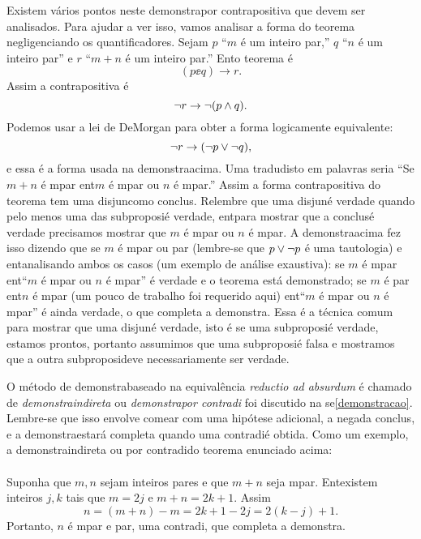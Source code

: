Existem v\'arios pontos neste demonstra\cao por contrapositiva que devem ser analisados. Para ajudar a ver isso, vamos analisar a forma do teorema negligenciando os quantificadores. Sejam $p$ ``$m$ \'e um inteiro par,'' $q$ ``$n$ \'e um inteiro par'' e $r$ ``$m+n$ \'e um inteiro par.'' Ent\ao o teorema \'e
\[
(p\ee q)\to r.
\]
Assim a contrapositiva \'e 
\[
\lnot r\to\lnot(p\wedge q).
\]
Podemos usar a lei de DeMorgan para obter a forma logicamente equivalente:
\[
\lnot r \to (\lnot p \vee\lnot q),
\]
e essa \'e a forma usada na demonstra\cao acima. Uma tradu\cao disto em palavras seria ``Se $m+n$ \'e \ih mpar ent\ao $m$ \'e \ih mpar ou $n$ \'e \ih mpar.'' Assim a forma contrapositiva do teorema tem uma disjun\cao como conclus\aoi. Relembre que uma disjun\cao \'e verdade quando pelo menos uma das subproposi\coes \'e verdade, ent\ao para mostrar que a conclus\ao \'e verdade precisamos mostrar que $m$ \'e \ih mpar ou $n$ \'e \ih mpar. A demonstra\cao acima fez isso dizendo que se $m$ \'e \ih mpar ou par (lembre-se que $p\vee\lnot p$ \'e uma tautologia) e ent\ao analisando ambos os casos (um exemplo de an\'alise exaustiva): se $m$ \'e \ih mpar ent\ao ``$m$ \'e \ih mpar ou $n$ \'e \ih mpar'' \'e verdade e o teorema est\'a demonstrado; se $m$ \'e par ent\ao $n$ \'e \ih mpar (um pouco de trabalho foi requerido aqui) ent\ao ``$m$ \'e \ih mpar ou $n$ \'e \ih mpar'' \'e ainda verdade, o que completa a demonstra\caoi. Essa \'e a t\'ecnica comum para mostrar que uma disjun\cao \'e verdade, isto \'e se uma subproposi\cao \'e verdade, estamos prontos, portanto assumimos que uma subproposi\cao \'e falsa e mostramos que a outra subproposi\cao deve necessariamente ser verdade.

O m\'etodo de demonstra\cao baseado na equival\^encia \emph{reductio ad absurdum} \'e chamado de \emph{demonstra\cao indireta} ou \emph{demonstra\cao por contradi\cao} foi discutido na se\cao \ref{demonstracao}. Lembre-se que isso envolve  come\cc ar com uma hip\'otese adicional, a nega\cao da conclus\aoi, e a demonstra\cao estar\'a completa quando uma contradi\cao \'e obtida. Como um exemplo, a demonstra\cao indireta ou por contradi\cao do teorema enunciado acima:
\\
\\
{\demo} Suponha que $m,n$ sejam inteiros pares e que $m+n$ seja \ih mpar. Ent\ao existem inteiros $j,k$ tais que $m=2j$ e $m+n=2k+1.$ Assim 
\[
n=(m+n)-m=2k+1-2j=2(k-j)+1.
\]
Portanto, $n$ \'e \ih mpar e par, uma contradi\caoi, que completa a demonstra\caoi.  \fim 

